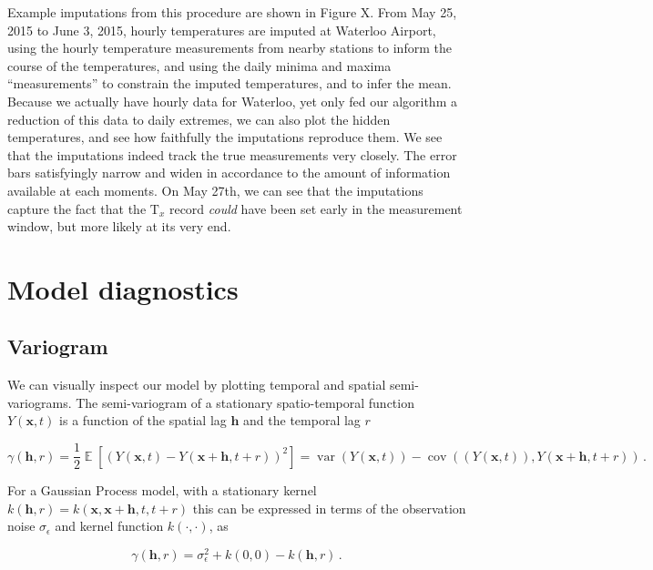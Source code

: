 \documentclass[letter]{article}
\newcommand{\genericdel}[3]{%
      \left#1#3\right#2
    }
\newcommand{\del}[1]{\genericdel(){#1}}
\newcommand{\sbr}[1]{\genericdel[]{#1}}
\DeclareMathOperator{\E}{\mathbb{E}}
\DeclareMathOperator{\cov}{{cov}}
\DeclareMathOperator{\var}{{var}}
\newcommand{\T}{\mathrm{T}}
\newcommand{\Tx}{\T_{x}}
\newcommand{\xvec}{\mathbold{x}}
\newcommand{\hvec}{\mathbold{h}}
\newcommand{\sigman}{\sigma_{\epsilon}}
\begin{document}
Example imputations from this procedure are shown in Figure X. From May
25, 2015 to June 3, 2015, hourly temperatures are imputed at Waterloo
Airport, using the hourly temperature measurements from nearby stations
to inform the course of the temperatures, and using the daily minima and
maxima ``measurements'' to constrain the imputed temperatures, and to
infer the mean. Because we actually have hourly data for Waterloo, yet
only fed our algorithm a reduction of this data to daily extremes, we
can also plot the hidden temperatures, and see how faithfully the
imputations reproduce them. We see that the imputations indeed track the
true measurements very closely. The error bars satisfyingly narrow and
widen in accordance to the amount of information available at each
moments. On May 27th, we can see that the imputations capture the fact
that the \(\Tx\) record \emph{could} have been set early in the
measurement window, but more likely at its very end.
    


    	\section{Model diagnostics}\label{model-diagnostics}

\subsection{Variogram}\label{variogram}

We can visually inspect our model by plotting temporal and spatial
semi-variograms. The semi-variogram of a stationary spatio-temporal
function \(Y(\xvec,t)\) is a function of the spatial lag \(\hvec\) and
the temporal lag \(r\)

\begin{equation}
    \gamma\del{\hvec,r} = \frac{1}{2} \E\sbr{\del{Y\del{\xvec,t}-Y\del{\xvec+\hvec,t+r}}^2} = \var\del{ Y\del{\xvec,t}} - \cov\del{ \del{Y\del{\xvec,t}} , Y\del{\xvec+\hvec,t+r}}\,.
\end{equation}

For a Gaussian Process model, with a stationary kernel
\(k(\hvec,r)=k(\xvec,\xvec+\hvec,t,t+r)\) this can be expressed in terms
of the observation noise \(\sigman\) and kernel function
\(k(\cdot,\cdot)\), as

\begin{equation}
    \label{eq:gp_variogram}
    \gamma\del{\hvec,r} = \sigman^2 + k\del{0,0} - k(\hvec,r)\,.
\end{equation}
\end{document}
